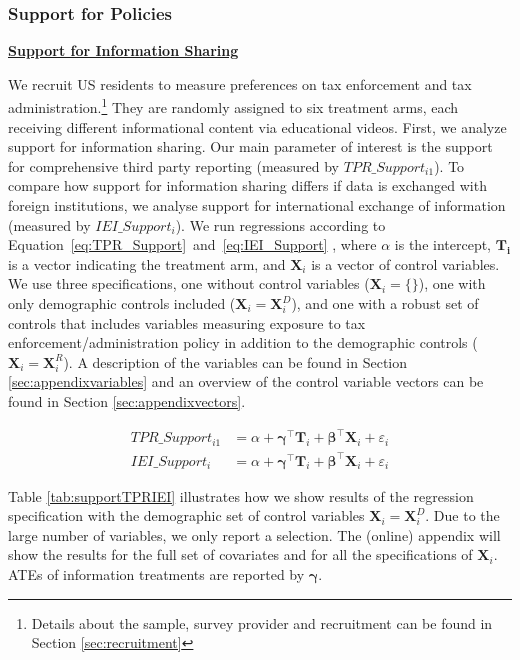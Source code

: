\documentclass[11pt]{article}
\begin{document}
\subsubsection{Support for Policies}
\begin{center}\textbf{\underline{Support for Information Sharing}}\end{center}
We recruit US residents to measure preferences on tax enforcement and tax administration.\footnote{Details about the sample, survey provider and recruitment can be found in Section \ref{sec:recruitment}} They are randomly assigned to six treatment arms, each receiving different informational content via educational videos. First, we analyze support for information sharing. Our main parameter of interest is the support for comprehensive third party reporting (measured by $TPR\_Support_{i1}$). To compare how support for information sharing differs if data is exchanged with foreign institutions, we analyse support for international exchange of information (measured by $IEI\_Support_{i}$). We run regressions according to Equation~\ref{eq:TPR_Support}~and~\ref{eq:IEI_Support} , where $\alpha$ is the intercept, $\mathbf{T_i}$ is a vector indicating the treatment arm, and $\mathbf{X}_{i}$ is a vector of control variables. We use three specifications, one without control variables ($\mathbf{X}_{i} = \{\}$), one with only demographic controls included ($\mathbf{X}_{i} = \mathbf{X}_{i}^{D}$), and one with a robust set of controls that includes variables measuring exposure to tax enforcement/administration policy in addition to the demographic controls ($\mathbf{X}_{i} = \mathbf{X}_{i}^{R}$). A description of the variables can be found in Section \ref{sec:appendixvariables} and an overview of the control variable vectors can be found in Section \ref{sec:appendixvectors}. 
\begin{center}
\begin{align}
\label{eq:TPR_Support}
        \text{$TPR\_Support_{i1}$} 
    &= \alpha + \boldsymbol{\gamma}^{\top}\mathbf{T}_i + \boldsymbol{\beta}^{\top}\mathbf{X}_{i} + \varepsilon_{i} \\[0.25em]
    \label{eq:IEI_Support}
        \text{$IEI\_Support_{i}$} 
    &= \alpha + \boldsymbol{\gamma}^{\top}\mathbf{T}_i + \boldsymbol{\beta}^{\top}\mathbf{X}_{i} +  \varepsilon_{i} 
\end{align}
\end{center}

Table \ref{tab:supportTPRIEI} illustrates how we show results of the regression specification with the demographic set of control variables $\mathbf{X}_{i} = \mathbf{X}_{i}^{D}$. Due to the large number of variables, we only report a selection. The (online) appendix will show the results for the full set of covariates and for all the specifications of $\mathbf{X}_{i}$. ATEs of information treatments are reported by $\boldsymbol{\gamma}$.
\end{document}
